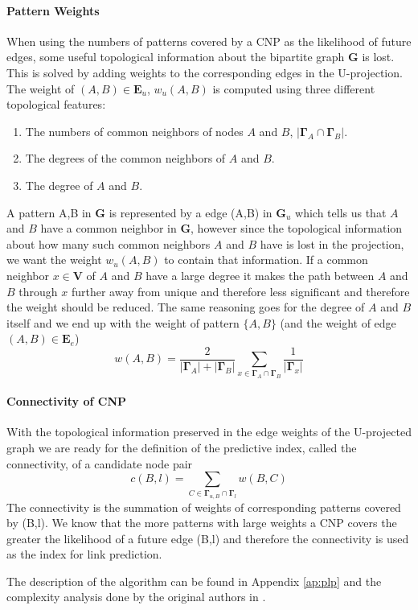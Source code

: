 \paragraph{Pattern Weights}
When using the numbers of patterns covered by a CNP as the likelihood of future edges, some useful topological information about the bipartite graph $\textbf{G}$ is lost. This is solved by adding weights to the corresponding edges in the U-projection. The weight of $(A,B)\in\textbf{E}_u$, $w_u(A,B)$ is computed using three different topological features:
\begin{enumerate}
\item The numbers of common neighbors of nodes $A$ and $B$, $|\bm{\Gamma}_{A}\cap\bm{\Gamma}_{B}|$.
\item The degrees of the common neighbors of $A$ and $B$.
\item The degree of $A$ and $B$.
\end{enumerate}
A pattern {A,B} in $\textbf{G}$ is represented by a edge (A,B) in $\textbf{G}_u$ which tells us that $A$ and $B$ have a common neighbor in $\textbf{G}$, however since the topological information about how many such common neighbors $A$ and $B$ have is lost in the projection, we want the weight $w_u(A,B)$ to contain that information. If a common neighbor $x\in\textbf{V}$ of $A$ and $B$ have a large degree it makes the path between $A$ and $B$ through $x$ further away from unique and therefore less significant and therefore the weight should be reduced. The same reasoning goes for the degree of $A$ and $B$ itself and we end up with the weight of pattern $\{A,B\}$ (and the weight of edge $(A,B)\in\textbf{E}_e$)
$$
    w(A,B) = \frac{2}{|\bm{\Gamma}_{A}|+|\bm{\Gamma}_{B}|} \sum_{x\in\bm{\Gamma}_{A}\cap\bm{\Gamma}_{B}} \frac{1}{|\bm{\Gamma}_{x}|}
$$

\paragraph{Connectivity of CNP}
With the topological information preserved in the edge weights of the U-projected graph we are ready for the definition of the predictive index, called the connectivity, of a candidate node pair
$$
 c(B,l) = \sum_{C\in\bm{\Gamma}_{u,B} \cap \bm{\Gamma}_{l} } w(B,C)
$$
The connectivity is the summation of weights of corresponding patterns covered by (B,l). We know that the more patterns with large weights a CNP covers the greater the likelihood of a future edge (B,l) and therefore the connectivity is used as the index for link prediction.

The description of the algorithm can be found in Appendix \ref{ap:plp} and the complexity analysis done by the original authors in \cite{plp}.
